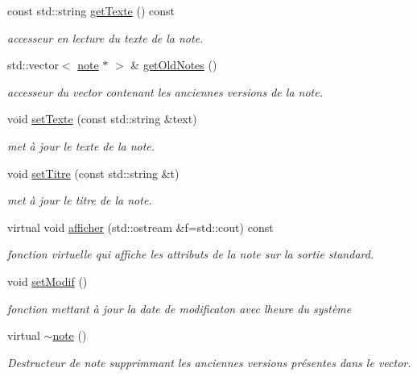\begin{DoxyCompactItemize}
\mbox{\label{classnote_a45af8038b60447374ba961a414910a49}} 
const std\+::string \hyperlink{classnote_a45af8038b60447374ba961a414910a49}{get\+Texte} () const
\begin{DoxyCompactList}\small\item\em accesseur en lecture du texte de la note. \end{DoxyCompactList}\item 
\mbox{\label{classnote_a8cfc267bcce6a99035df33e420a18f38}} 
std\+::vector$<$ \hyperlink{classnote}{note} $\ast$ $>$ \& \hyperlink{classnote_a8cfc267bcce6a99035df33e420a18f38}{get\+Old\+Notes} ()
\begin{DoxyCompactList}\small\item\em accesseur du vector contenant les anciennes versions de la note. \end{DoxyCompactList}\item 
void \hyperlink{classnote_a2895efc80041830db954a5af4b0670bf}{set\+Texte} (const std\+::string \&text)
\begin{DoxyCompactList}\small\item\em met à jour le texte de la note. \end{DoxyCompactList}\item 
void \hyperlink{classnote_a70884d3640a6f4440ddb9bd30925b5e7}{set\+Titre} (const std\+::string \&t)
\begin{DoxyCompactList}\small\item\em met à jour le titre de la note. \end{DoxyCompactList}\item 
\mbox{\label{classnote_a8fce1df255349a335517128f8e9af543}} 
virtual void \hyperlink{classnote_a8fce1df255349a335517128f8e9af543}{afficher} (std\+::ostream \&f=std\+::cout) const
\begin{DoxyCompactList}\small\item\em fonction virtuelle qui affiche les attributs de la note sur la sortie standard. \end{DoxyCompactList}\item 
\mbox{\label{classnote_ab90880ae93348a23d0f84f2c2931e0bf}} 
void \hyperlink{classnote_ab90880ae93348a23d0f84f2c2931e0bf}{set\+Modif} ()
\begin{DoxyCompactList}\small\item\em fonction mettant à jour la date de modificaton avec l\textquotesingle{}heure du système \end{DoxyCompactList}\item 
\mbox{\label{classnote_abaece2737aa27cf5efb19e75bedcc41f}} 
virtual \hyperlink{classnote_abaece2737aa27cf5efb19e75bedcc41f}{$\sim$note} ()
\begin{DoxyCompactList}\small\item\em Destructeur de note supprimmant les anciennes versions présentes dans le vector. \end{DoxyCompactList}\end{DoxyCompactItemize}
